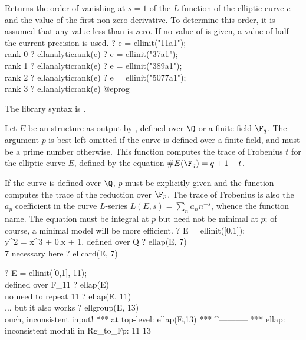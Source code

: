 \label{se:ellanalyticrank}
Returns the order of vanishing at $s=1$ of the $L$-function of the
elliptic curve $e$ and the value of the first non-zero derivative. To
determine this order, it is assumed that any value less than  is
zero. If no value of  is given, a value of half the current
precision is used.
\bprog
? e = ellinit("11a1"); \\ rank 0
? ellanalyticrank(e)
? e = ellinit("37a1"); \\ rank 1
? ellanalyticrank(e)
? e = ellinit("389a1"); \\ rank 2
? ellanalyticrank(e)
? e = ellinit("5077a1"); \\ rank 3
? ellanalyticrank(e)
@eprog

The library syntax is .

\label{se:ellap}
Let $E$ be an  structure as output by , defined over
$\Q$ or a finite field $\F_q$. The argument $p$ is best left omitted if the
curve is defined over a finite field, and must be a prime number otherwise.
This function computes the trace of Frobenius $t$ for the elliptic curve $E$,
defined by the equation $\#E(\F_q) = q+1 - t$.

If the curve is defined over $\Q$, $p$ must be explicitly given and the
function computes the trace of the reduction over $\F_p$.
The trace of Frobenius is also the $a_p$ coefficient in the curve $L$-series
$L(E,s) = \sum_n a_n n^{-s}$, whence the function name. The equation must be
integral at $p$ but need not be minimal at $p$; of course, a minimal model
will be more efficient.
\bprog
? E = ellinit([0,1]);  \\ y^2 = x^3 + 0.x + 1, defined over Q
? ellap(E, 7) \\ 7 necessary here
? ellcard(E, 7)

? E = ellinit([0,1], 11);  \\ defined over F_11
? ellap(E)       \\ no need to repeat 11
? ellap(E, 11)   \\ ... but it also works
? ellgroup(E, 13) \\ ouch, inconsistent input!
   ***   at top-level: ellap(E,13)
   ***                 ^-----------
   *** ellap: inconsistent moduli in Rg_to_Fp:
     11
     13

